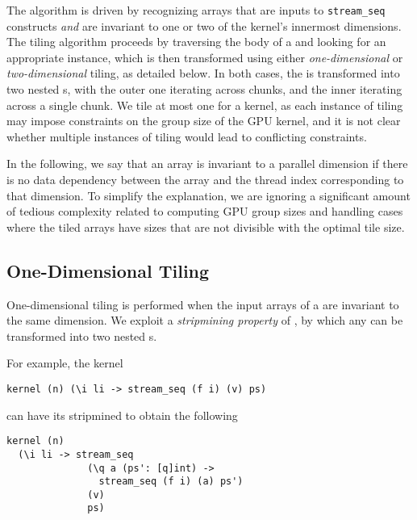 The algorithm is driven by recognizing arrays that are inputs to
\lstinline{stream_seq} constructs \textit{and} are invariant to one or
two of the kernel's innermost dimensions.  The tiling algorithm
proceeds by traversing the body of a  and looking for an
appropriate \StreamSeq{} instance, which is then transformed using
either \textit{one-dimensional} or \textit{two-dimensional} tiling, as
detailed below.  In both cases, the \StreamSeq{} is transformed into
two nested \StreamSeq{}s, with the outer one iterating across chunks,
and the inner iterating across a single chunk.  We tile at most one
\StreamSeq{} for a kernel, as each instance of tiling may impose
constraints on the group size of the GPU kernel, and it is not clear
whether multiple instances of tiling would lead to conflicting
constraints.

In the following, we say that an array is invariant to a parallel
dimension if there is no data dependency between the array and the
thread index corresponding to that dimension.  To simplify the
explanation, we are ignoring a significant amount of tedious complexity
related to computing GPU group sizes and handling cases where the tiled
arrays have sizes that are not divisible with the optimal tile size.

\subsection{One-Dimensional Tiling}
\label{sec:one-dimensional-tiling}

One-dimensional tiling is performed when the input arrays of a
\StreamSeq{} are invariant to the same dimension.  We exploit a
\textit{stripmining property} of \StreamSeq{}, by which any
\StreamSeq{} can be transformed into two nested
\StreamSeq{}s.

For example, the kernel
\begin{lstlisting}
kernel (n) (\i li -> stream_seq (f i) (v) ps)
\end{lstlisting}
\noindent can have its \StreamSeq{} stripmined to obtain the following
\begin{lstlisting}
kernel (n)
  (\i li -> stream_seq
              (\q a (ps': [q]int) ->
                stream_seq (f i) (a) ps')
              (v)
              ps)
\end{lstlisting}

